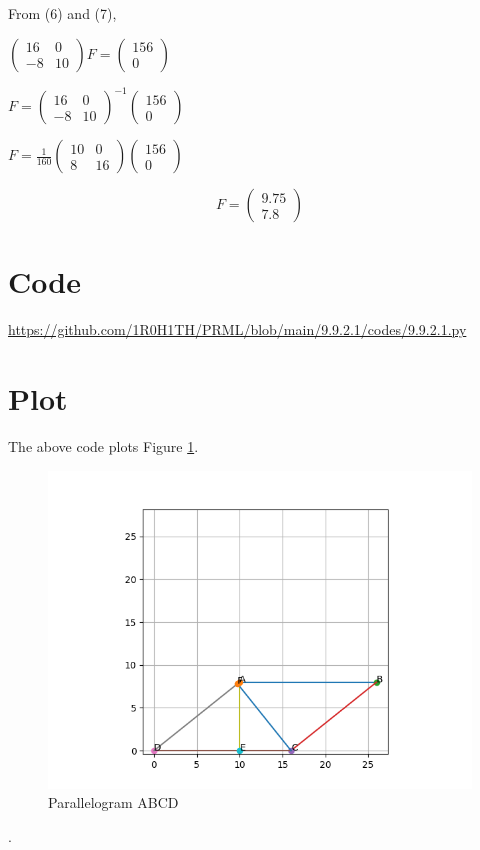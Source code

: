 \documentclass[letterpaper,12pt]{article}
\begin{document}
\clearpage

From (6) and (7),
\begin{center}
    $\begin{pmatrix}16 & 0 \\ -8 & 10 \end{pmatrix}F = \begin{pmatrix} 156 \\ 0 \end{pmatrix}$
\end{center}
\begin{center}
    $F = \begin{pmatrix}16 & 0 \\ -8 & 10 \end{pmatrix}^{-1}\begin{pmatrix} 156 \\ 0 \end{pmatrix}$
\end{center}
\begin{center}
    $F = \frac{1}{160}\begin{pmatrix}10 & 0 \\ 8 & 16 \end{pmatrix}\begin{pmatrix} 156 \\ 0 \end{pmatrix}$
\end{center}
\begin{equation}
    F = \begin{pmatrix}9.75 \\ 7.8\end{pmatrix}
\end{equation}

\section{Code}
\url{https://github.com/1R0H1TH/PRML/blob/main/9.9.2.1/codes/9.9.2.1.py}

\section{Plot}
The above code plots Figure \ref{fig:fig2}.
\begin{figure}[!ht]
\centering
\includegraphics[width=0.75\columnwidth]{figs/Figure_1.png}
\caption{Parallelogram ABCD}
\label{fig:fig2}
\end{figure}.
\end{document}

